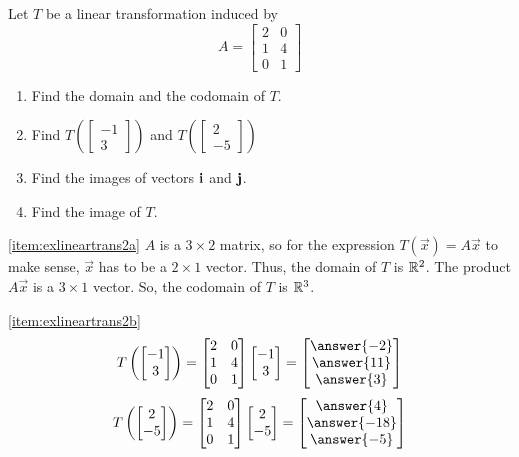\documentclass{ximera}
\begin{document}
\begin{example}\label{ex:lineartrans2}
Let $T$ be a linear transformation induced by $$A=\begin{bmatrix}
2&0\\
1&4\\
0&1
\end{bmatrix}$$
\begin{enumerate}
\item \label{item:exlineartrans2a}
Find the domain and the codomain of $T$.
\item \label{item:exlineartrans2b}
Find $T\left(\begin{bmatrix}
-1\\
3
\end{bmatrix}\right)$ and $T\left(\begin{bmatrix}
2\\
-5
\end{bmatrix}\right)$

\item \label{item:exlineartrans2c}
Find the images of vectors ${\bf i}$ and ${\bf j}$.
\item \label{item:exlineartrans2d}
Find the image of $T$.
\end{enumerate}

\begin{explanation}
\ref{item:exlineartrans2a} $A$ is a $3\times 2$ matrix, so for the expression $T(\vec{x})=A\vec{x}$ to make sense, $\vec{x}$ has to be a $2\times 1$ vector.  Thus, the domain of $T$ is $\mathbb{R}^2$.  The product $A\vec{x}$ is a $3\times 1$ vector.  So, the codomain of $T$ is $\mathbb{R}^3$.

\ref{item:exlineartrans2b} $$T\left(\begin{bmatrix}-1\\3\end{bmatrix}\right)=\begin{bmatrix}
2&0\\
1&4\\
0&1
\end{bmatrix}\begin{bmatrix}-1\\3\end{bmatrix}=\begin{bmatrix}\answer{-2}\\\answer{11}\\\answer{3}\end{bmatrix}$$
$$T\left(\begin{bmatrix}2\\-5\end{bmatrix}\right)=\begin{bmatrix}
2&0\\
1&4\\
0&1
\end{bmatrix}\begin{bmatrix}2\\-5\end{bmatrix}=\begin{bmatrix}\answer{4}\\\answer{-18}\\\answer{-5}\end{bmatrix}$$


\end{explanation}
\end{example}
\end{document}
